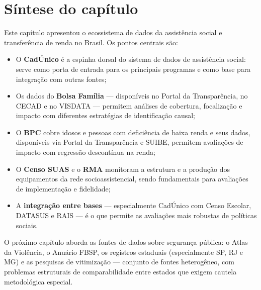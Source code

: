 \section{Síntese do capítulo}

Este capítulo apresentou o ecossistema de dados da assistência social e transferência de renda no Brasil. Os pontos centrais são:

\begin{itemize}
  \item O \textbf{CadÚnico} é a espinha dorsal do sistema de dados de assistência social: serve como porta de entrada para os principais programas e como base para integração com outras fontes;
  \item Os dados do \textbf{Bolsa Família} — disponíveis no Portal da Transparência, no CECAD e no VISDATA — permitem análises de cobertura, focalização e impacto com diferentes estratégias de identificação causal;
  \item O \textbf{BPC} cobre idosos e pessoas com deficiência de baixa renda e seus dados, disponíveis via Portal da Transparência e SUIBE, permitem avaliações de impacto com regressão descontínua na renda;
  \item O \textbf{Censo SUAS} e o \textbf{RMA} monitoram a estrutura e a produção dos equipamentos da rede socioassistencial, sendo fundamentais para avaliações de implementação e fidelidade;
  \item A \textbf{integração entre bases} — especialmente CadÚnico com Censo Escolar, DATASUS e RAIS — é o que permite as avaliações mais robustas de políticas sociais.
\end{itemize}

O próximo capítulo aborda as fontes de dados sobre segurança pública: o Atlas da Violência, o Anuário FBSP, os registros estaduais (especialmente SP, RJ e MG) e as pesquisas de vitimização --- conjunto de fontes heterogêneo, com problemas estruturais de comparabilidade entre estados que exigem cautela metodológica especial.